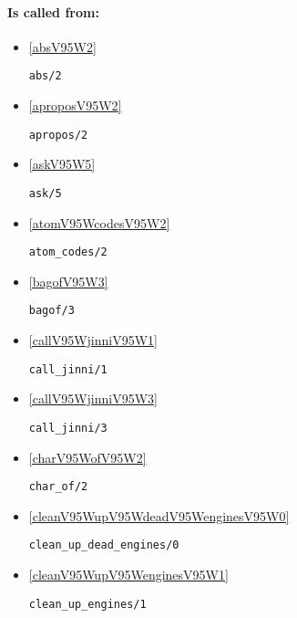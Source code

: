 \paragraph{Is called from:} 
\begin{itemize}
\item \ref{absV95W2} 
\begin{verbatim}
abs/2
\end{verbatim}

\item \ref{aproposV95W2} 
\begin{verbatim}
apropos/2
\end{verbatim}

\item \ref{askV95W5} 
\begin{verbatim}
ask/5
\end{verbatim}

\item \ref{atomV95WcodesV95W2} 
\begin{verbatim}
atom_codes/2
\end{verbatim}

\item \ref{bagofV95W3} 
\begin{verbatim}
bagof/3
\end{verbatim}

\item \ref{callV95WjinniV95W1} 
\begin{verbatim}
call_jinni/1
\end{verbatim}

\item \ref{callV95WjinniV95W3} 
\begin{verbatim}
call_jinni/3
\end{verbatim}

\item \ref{charV95WofV95W2} 
\begin{verbatim}
char_of/2
\end{verbatim}

\item \ref{cleanV95WupV95WdeadV95WenginesV95W0} 
\begin{verbatim}
clean_up_dead_engines/0
\end{verbatim}

\item \ref{cleanV95WupV95WenginesV95W1} 
\begin{verbatim}
clean_up_engines/1
\end{verbatim}


\end{itemize}
